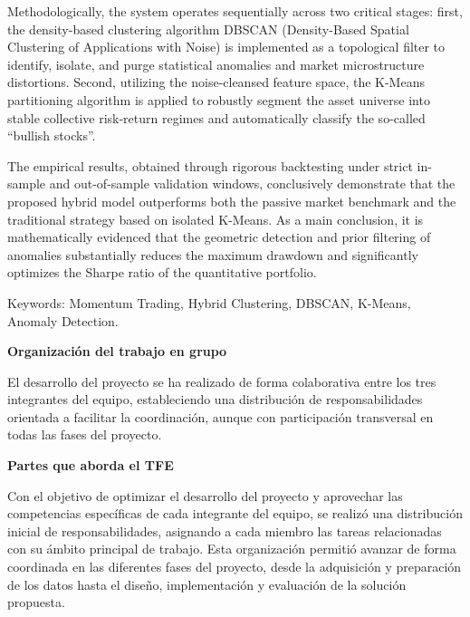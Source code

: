 \documentclass[
]{article}
\begin{document}
	Methodologically, the system operates sequentially across two critical stages: first, the density-based clustering algorithm DBSCAN (Density-Based Spatial Clustering of Applications with Noise) is implemented as a topological filter to identify, isolate, and purge statistical anomalies and market microstructure distortions. Second, utilizing the noise-cleansed feature space, the K-Means partitioning algorithm is applied to robustly segment the asset universe into stable collective risk-return regimes and automatically classify the so-called ``bullish stocks''.
	
	The empirical results, obtained through rigorous backtesting under strict in-sample and out-of-sample validation windows, conclusively demonstrate that the proposed hybrid model outperforms both the passive market benchmark and the traditional strategy based on isolated K-Means. As a main conclusion, it is mathematically evidenced that the geometric detection and prior filtering of anomalies substantially reduces the maximum drawdown and significantly optimizes the Sharpe ratio of the quantitative portfolio.
	
	Keywords: Momentum Trading, Hybrid Clustering, DBSCAN, K-Means, Anomaly Detection.
	
	\newpage
	
	\tableofcontents
	
	\newpage

  	\listoffigures
  	
  	\newpage
	
  	\listoftables
  	
  	\newpage
	
	\printglossary[type=\acronymtype,title=Glosario de términos]
	
	\newpage
	
	\textbf{\Large Organización del trabajo en grupo}
	
	El desarrollo del proyecto se ha realizado de forma colaborativa entre los tres integrantes del equipo, estableciendo una distribución de responsabilidades orientada a facilitar la coordinación, aunque con participación transversal en todas las fases del proyecto.
	
	\textbf{Partes que aborda el TFE}
	
	Con el objetivo de optimizar el desarrollo del proyecto y aprovechar las competencias específicas de cada integrante del equipo, se realizó una distribución inicial de responsabilidades, asignando a cada miembro las tareas relacionadas con su ámbito principal de trabajo. Esta organización permitió avanzar de forma coordinada en las diferentes fases del proyecto, desde la adquisición y preparación de los datos hasta el diseño, implementación y evaluación de la solución propuesta.
	
\end{document}
